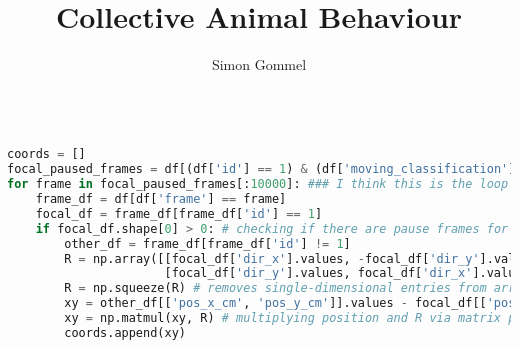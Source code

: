 \documentclass[12pt,a4paper]{scrartcl}
\title{Collective Animal Behaviour}
\author{Simon Gommel}
\begin{document}
\pagestyle{empty}

\begin{lstlisting}[language=python]

coords = []
focal_paused_frames = df[(df['id'] == 1) & (df['moving_classification'] == 0)]['frame'].values
for frame in focal_paused_frames[:10000]: ### I think this is the loop we have to somehow change to get the program more effective
    frame_df = df[df['frame'] == frame]
    focal_df = frame_df[frame_df['id'] == 1]
    if focal_df.shape[0] > 0: # checking if there are pause frames for the current focal individual
        other_df = frame_df[frame_df['id'] != 1]
        R = np.array([[focal_df['dir_x'].values, -focal_df['dir_y'].values], # defining rotation matrix R
                      [focal_df['dir_y'].values, focal_df['dir_x'].values]])
        R = np.squeeze(R) # removes single-dimensional entries from arrays (8, 1, 3) => (8, 3)
        xy = other_df[['pos_x_cm', 'pos_y_cm']].values - focal_df[['pos_x_cm', 'pos_y_cm']].values
        xy = np.matmul(xy, R) # multiplying position and R via matrix product
        coords.append(xy)

\end{lstlisting}
\end{document}

